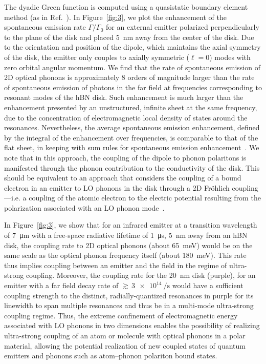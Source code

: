 \documentclass[aps,prb,twocolumn,
	           groupedaddress,superscriptaddress,
               amsfonts,amssymb,amsmath,floatfix,
	           citeautoscript]{revtex4-1}
\makeatletter
\newcommand{\ie}{i.e.\@\xspace} %
\makeatother
\begin{document}
The dyadic Green function is computed using a quasistatic boundary element method (as in Ref.~). In Figure~\ref{fig:3}, we plot the enhancement of the spontaneous emission rate $\Gamma/\Gamma_0$ for an external emitter polarized perpendicularly to the plane of the disk and placed \SI{5}{\nm} away from the center of the disk. Due to the orientation and position of the dipole, which maintains the axial symmetry of the disk, the emitter only couples to axially symmetric ($\ell = 0$)  modes with zero orbital angular momentum. We find that the rate of spontaneous emission of 2D optical phonons is approximately 8 orders of magnitude larger than the rate of spontaneous emission of photons in the far field at frequencies corresponding to resonant modes of the hBN disk. Such enhancement is much larger than the enhancement presented by an unstructured, infinite sheet at the same frequency, due to the concentration of electromagnetic local density of states around the resonances. Nevertheless, the average spontaneous emission enhancement, defined by the integral of the enhancement over frequencies, is comparable to that of the flat sheet, in keeping with sum rules for spontaneous emission enhancement~\cite{scheel2008macroscopic}.  We note that in this approach, the coupling of the dipole to phonon polaritons is manifested through the phonon contribution to the conductivity of the disk. This should be equivalent to an approach that considers the coupling of a bound electron in an emitter to LO phonons in the disk through a 2D Fr\"ohlich coupling---\ie a coupling of the atomic electron to the electric potential resulting from the polarization associated with an LO phonon mode~\cite{sohier2016two}.

In Figure~\ref{fig:3}, we show that for an infrared emitter at a transition wavelength of \SI{7}{\micro\m} with a free-space radiative lifetime of \SI{1}{\micro\s}, \SI{5}{\nm} away from an hBN disk, the coupling rate to 2D optical phonons (about \SI{65}{\meV}) would be on the same scale as the optical phonon frequency itself (about \SI{180}{\meV}). This rate thus implies coupling between an emitter and the field in the regime of ultra-strong coupling. Moreover, the coupling rate for the \SI{20}{\nm} disk (purple), for an emitter with a far field decay rate of ${\gtrsim}\,\SI{3e14}{\per\s}$ would have a sufficient coupling strength to the distinct, radially-quantized resonances in purple for its linewidth to span multiple resonances and thus be in a multi-mode ultra-strong coupling regime. Thus, the extreme confinement of electromagnetic energy associated with LO phonons in two dimensions enables the possibility of realizing ultra-strong coupling of an atom or molecule with optical phonons in a polar material, allowing the potential realization of new coupled states of quantum emitters and phonons such as atom--phonon polariton bound states.
\end{document}
